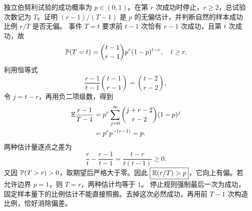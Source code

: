 独立伯努利试验的成功概率为 $p\in(0,1)$。在第 $r$ 次成功时停止，$r\ge2$，总试验次数记为 $T$。证明 $(r-1)/(T-1)$ 是 $p$ 的无偏估计，并判断自然的样本成功比例 $r/T$ 是否无偏。
\solution 事件 $T=t$ 要求前 $t-1$ 次恰有 $r-1$ 次成功，且第 $t$ 次成功，故
\[
\mathbb{P}(T=t)=\binom{t-1}{r-1}p^r(1-p)^{t-r},\quad t\ge r.
\]
利用恒等式
\[
\frac{r-1}{t-1}\binom{t-1}{r-1}=\binom{t-2}{r-2},
\]
令 $j=t-r$，再用负二项级数，得到
\[
\begin{aligned}
\mathbb{E}\frac{r-1}{T-1}
&=p^r\sum_{j=0}^\infty\binom{j+r-2}{r-2}(1-p)^j\\
&=p^r p^{-(r-1)}=p.
\end{aligned}
\]
两种估计量逐点之差为
\[
\frac rt-\frac{r-1}{t-1}=\frac{t-r}{t(t-1)}\ge0.
\]
又因 $\mathbb{P}(T>r)>0$，取期望后严格大于零。因此 $\boxed{\mathbb{E}(r/T)>p}$，它向上有偏。若允许边界 $p=1$，则 $T=r$，两种估计均等于 $1$。
\insight 停止规则强制最后一次为成功，固定样本量下的比例估计不能直接照搬。去掉这次必然成功，再用前 $T-1$ 次构造比例，恰好消除偏差。
